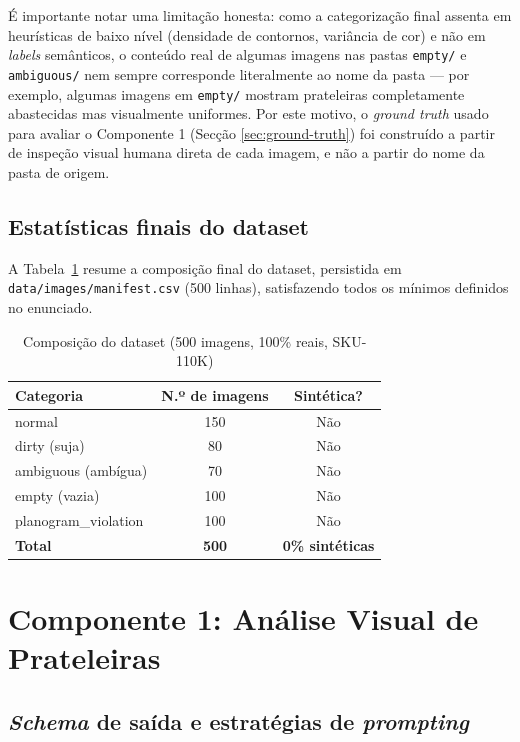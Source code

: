 \documentclass[conference]{IEEEtran}
\begin{document}
É importante notar uma limitação honesta: como a categorização final
assenta em heurísticas de baixo nível (densidade de contornos, variância de
cor) e não em \textit{labels} semânticos, o conteúdo real de algumas imagens
nas pastas \texttt{empty/} e \texttt{ambiguous/} nem sempre corresponde
literalmente ao nome da pasta --- por exemplo, algumas imagens em
\texttt{empty/} mostram prateleiras completamente abastecidas mas
visualmente uniformes. Por este motivo, o \textit{ground truth} usado para
avaliar o Componente 1 (Secção \ref{sec:ground-truth}) foi construído a
partir de inspeção visual humana direta de cada imagem, e não a partir do
nome da pasta de origem.

\subsection{Estatísticas finais do dataset}

A Tabela~\ref{tab:dataset} resume a composição final do dataset, persistida
em \texttt{data/images/manifest.csv} (500 linhas), satisfazendo todos os
mínimos definidos no enunciado.

\begin{table}[h]
\centering
\caption{Composição do dataset (500 imagens, 100\% reais, SKU-110K)}
\label{tab:dataset}
\begin{tabular}{lcc}
\toprule
Categoria & N.º de imagens & Sintética? \\
\midrule
normal & 150 & Não \\
dirty (suja) & 80 & Não \\
ambiguous (ambígua) & 70 & Não \\
empty (vazia) & 100 & Não \\
planogram\_violation & 100 & Não \\
\midrule
\textbf{Total} & \textbf{500} & \textbf{0\% sintéticas} \\
\bottomrule
\end{tabular}
\end{table}

\section{Componente 1: Análise Visual de Prateleiras}
\label{sec:visual}

\subsection{\textit{Schema} de saída e estratégias de \textit{prompting}}
\end{document}
